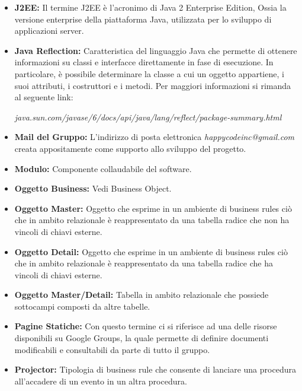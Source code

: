 \documentclass[11pt,titlepage,a4paper]{report}
\begin{document}
\begin{itemize}
\item{\textbf{J2EE:}
Il termine J2EE \`e l'acronimo di Java 2 Enterprise Edition, Ossia la versione enterprise della piattaforma Java, utilizzata per lo sviluppo di applicazioni server.}

\item{\textbf{Java Reflection:}
Caratteristica del linguaggio Java che permette di ottenere informazioni su classi e interfacce direttamente in fase di esecuzione. In particolare, \`e possibile determinare la classe a cui un oggetto appartiene, i suoi attributi, i costruttori e i metodi.
Per maggiori informazioni si rimanda al seguente link:  \begin{small}\textit{java.sun.com/javase/6/docs/api/java/lang/reflect/package-summary.html}\end{small}}

\item{\textbf{Mail del Gruppo:}
L'indirizzo di posta elettronica \textit{happycodeinc@gmail.com} creata appositamente come supporto allo sviluppo del progetto.}

\item{\textbf{Modulo:}
Componente collaudabile del software.}

\item{\textbf{Oggetto Business:}
Vedi Business Object.}

\item{\textbf{Oggetto Master:}
Oggetto che esprime in un ambiente di business rules ci\`o che in ambito relazionale \`e reappresentato da  una tabella radice che non ha vincoli di chiavi esterne.}

\item{\textbf{Oggetto Detail:}
Oggetto che esprime in un ambiente di business rules ci\`o che in ambito relazionale \`e reappresentato da  una tabella radice che ha vincoli di chiavi esterne.}

\item{\textbf{Oggetto Master/Detail:}
Tabella in ambito relazionale che possiede sottocampi composti da altre tabelle.}

\item{\textbf{Pagine Statiche:}
Con questo termine ci si riferisce ad una delle risorse disponibili su Google Groups,  la quale permette di definire documenti modificabili e consultabili da parte di tutto il gruppo.}

\item{\textbf{Projector:}
Tipologia di business rule che consente di lanciare una procedura all'accadere di un evento in un altra procedura.}


\end{itemize}
\end{document}
